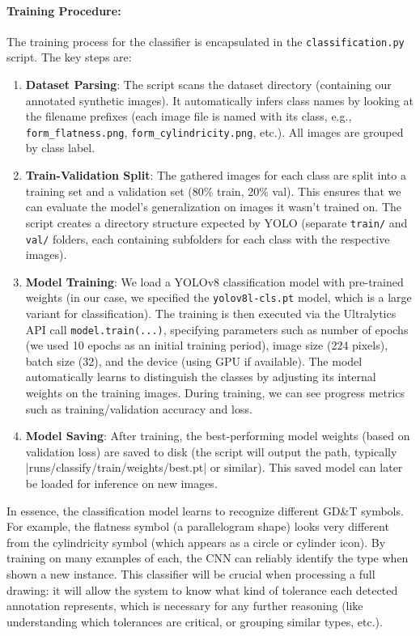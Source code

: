 \documentclass[11pt,a4paper]{article}
\begin{document}
\paragraph{Training Procedure:} The training process for the classifier is encapsulated in the \verb|classification.py| script. The key steps are:
\begin{enumerate}
    \item \textbf{Dataset Parsing}: The script scans the dataset directory (containing our annotated synthetic images). It automatically infers class names by looking at the filename prefixes (each image file is named with its class, e.g., \verb|form_flatness.png|, \verb|form_cylindricity.png|, etc.). All images are grouped by class label.
    \item \textbf{Train-Validation Split}: The gathered images for each class are split into a training set and a validation set (80\% train, 20\% val). This ensures that we can evaluate the model’s generalization on images it wasn’t trained on. The script creates a directory structure expected by YOLO (separate \verb|train/| and \verb|val/| folders, each containing subfolders for each class with the respective images).
    \item \textbf{Model Training}: We load a YOLOv8 classification model with pre-trained weights (in our case, we specified the \verb|yolov8l-cls.pt| model, which is a large variant for classification). The training is then executed via the Ultralytics API call \verb|model.train(...)|, specifying parameters such as number of epochs (we used 10 epochs as an initial training period), image size (224 pixels), batch size (32), and the device (using GPU if available). The model automatically learns to distinguish the classes by adjusting its internal weights on the training images. During training, we can see progress metrics such as training/validation accuracy and loss.
    \item \textbf{Model Saving}: After training, the best-performing model weights (based on validation loss) are saved to disk (the script will output the path, typically \texttt{}|runs/classify/train/weights/best.pt| or similar). This saved model can later be loaded for inference on new images.
\end{enumerate}

In essence, the classification model learns to recognize different GD\&T symbols. For example, the flatness symbol (a parallelogram shape) looks very different from the cylindricity symbol (which appears as a circle or cylinder icon). By training on many examples of each, the CNN can reliably identify the type when shown a new instance. This classifier will be crucial when processing a full drawing: it will allow the system to know what kind of tolerance each detected annotation represents, which is necessary for any further reasoning (like understanding which tolerances are critical, or grouping similar types, etc.).
\end{document}
